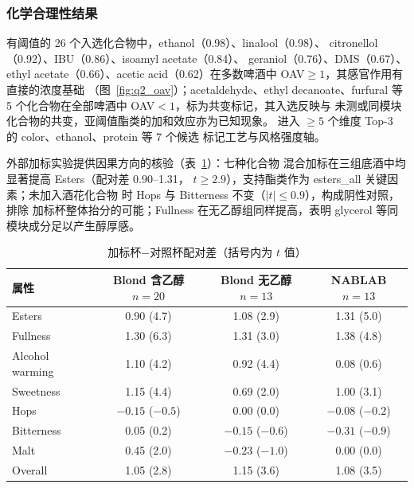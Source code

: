 \documentclass[12pt,a4paper]{article}
\begin{document}
\subsubsection{化学合理性结果}

有阈值的 26 个入选化合物中，ethanol（0.98）、linalool（0.98）、
citronellol（0.92）、IBU（0.86）、isoamyl acetate（0.84）、
geraniol（0.76）、DMS（0.67）、ethyl acetate（0.66）、acetic
acid（0.62）在多数啤酒中 OAV$\ge1$，其感官作用有直接的浓度基础
（图~\ref{fig:q2_oav}）；acetaldehyde、ethyl decanoate、furfural
等 5 个化合物在全部啤酒中 OAV$<1$，标为共变标记，其入选反映与
未测或同模块化合物的共变，亚阈值酯类的加和效应亦为已知现象。
进入 $\ge5$ 个维度 Top-3 的 color、ethanol、protein 等 7 个候选
标记工艺与风格强度轴。


外部加标实验提供因果方向的核验（表~\ref{tab:spike}）：七种化合物
混合加标在三组底酒中均显著提高 Esters（配对差 0.90--1.31，
$t\ge2.9$），支持酯类作为 esters\_all 关键因素；未加入酒花化合物
时 Hops 与 Bitterness 不变（$|t|\le0.9$），构成阴性对照，排除
加标杯整体抬分的可能；Fullness 在无乙醇组同样提高，表明 glycerol
等同模块成分足以产生醇厚感。

\begin{table}[!htbp]
  \centering\small
  \caption{加标杯$-$对照杯配对差（括号内为 $t$ 值）}
  \label{tab:spike}
  \begin{tabular}{lccc}
    \toprule
    属性 & Blond 含乙醇 $n{=}20$ & Blond 无乙醇 $n{=}13$ & NABLAB $n{=}13$ \\
    \midrule
    Esters & 0.90 (4.7) & 1.08 (2.9) & 1.31 (5.0) \\
    Fullness & 1.30 (6.3) & 1.31 (3.0) & 1.38 (4.8) \\
    Alcohol warming & 1.10 (4.2) & 0.92 (4.4) & 0.08 (0.6) \\
    Sweetness & 1.15 (4.4) & 0.69 (2.0) & 1.00 (3.1) \\
    Hops & $-0.15$ ($-0.5$) & 0.00 (0.0) & $-0.08$ ($-0.2$) \\
    Bitterness & 0.05 (0.2) & $-0.15$ ($-0.6$) & $-0.31$ ($-0.9$) \\
    Malt & 0.45 (2.0) & $-0.23$ ($-1.0$) & 0.00 (0.0) \\
    Overall & 1.05 (2.8) & 1.15 (3.6) & 1.08 (3.5) \\
    \bottomrule
  \end{tabular}
\end{table}
\end{document}
